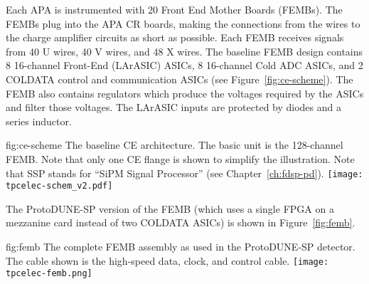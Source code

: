 Each APA is instrumented with 20 Front End Mother Boards (FEMBs).
The FEMBs plug into the APA CR boards, making the connections from the wires to the charge amplifier circuits as short as possible.
Each FEMB receives signals from 40 U wires, 40 V wires, and 48 X wires.
The baseline FEMB design contains 8 16-channel Front-End (LArASIC) ASICs, 8 16-channel Cold ADC ASICs, and 2 COLDATA control and communication ASICs (see Figure~\ref{fig:ce-scheme}).
The FEMB also contains regulators which produce the voltages required by the ASICs and 
filter those voltages.
The LArASIC inputs are protected by diodes and a series inductor.

\begin{dunefigure}
{fig:ce-scheme}
{The baseline CE architecture. The basic unit is the 128-channel FEMB. Note that only one CE flange is shown to simplify the illustration. Note that SSP stands for ``SiPM Signal Processor'' (see Chapter~\ref{ch:fdsp-pd}).}
\texttt{[image: tpcelec-schem\_v2.pdf]}
\end{dunefigure}

The ProtoDUNE-SP version of the FEMB (which uses a single FPGA on a mezzanine card instead of two COLDATA ASICs) is shown in Figure~\ref{fig:femb}.

\begin{dunefigure}
{fig:femb}
{The complete FEMB assembly as used in the ProtoDUNE-SP detector. The cable shown is the high-speed data, clock, and control cable.}
\texttt{[image: tpcelec-femb.png]}
\end{dunefigure}
